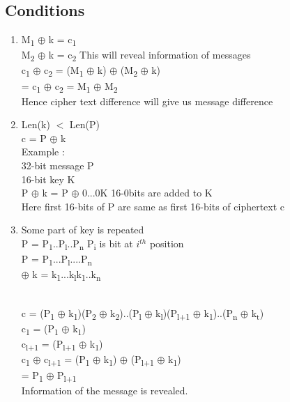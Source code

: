\documentclass[11pt]{article}
\begin{document}
	\subsection*{Conditions}
	\begin{enumerate}
		\item M\textsubscript1 $\oplus$ k = c\textsubscript1 \\
		M\textsubscript2 $\oplus$ k = c\textsubscript2 \hspace{1cm} This will reveal information of messages\\
		c\textsubscript1 $\oplus$ c\textsubscript2 = (M\textsubscript1 $\oplus$ k) $\oplus$ (M\textsubscript2 $\oplus$ k)\\\hspace{1.4cm}= c\textsubscript1 $\oplus$ c\textsubscript2 = M\textsubscript1 $\oplus$ M\textsubscript2\\
		Hence cipher text difference will give us message difference
		\item Len(k) $<$ Len(P)\\
		c = P $\oplus$ k\\
		Example :\\
		32-bit message P\\
		16-bit key K\\
		P $\oplus$ k = P $\oplus$ 0...0K \hspace{1cm} 16-0bits are added to K\\
		Here first 16-bits of P are same as first 16-bits of ciphertext c \\
		\item Some part of key is repeated \\
		P = P\textsubscript{1}..P\textsubscript{l}..P\textsubscript{n} \hfill P\textsubscript{i} is bit at $i^{th}$ position\\ \vspace{.3cm}
		\hspace{0.33cm}P = P\textsubscript{1}...P\textsubscript{l}....P\textsubscript{n}\\
		$\oplus$ k = k\textsubscript{1}...k\textsubscript{l}k\textsubscript{1}..k\textsubscript{n}\\
		\\
		c = (P\textsubscript{1} $\oplus$ k\textsubscript{1})(P\textsubscript{2} $\oplus$ k\textsubscript{2})..(P\textsubscript{l} $\oplus$ k\textsubscript{l})(P\textsubscript{l+1} $\oplus$ k\textsubscript{1})..(P\textsubscript{n} $\oplus$ k\textsubscript{t})\\
		c\textsubscript{1} = (P\textsubscript{1} $\oplus$ k\textsubscript{1})\\
		c\textsubscript{l+1} = (P\textsubscript{l+1} $\oplus$ k\textsubscript{1})\\
		c\textsubscript{1} $\oplus$ c\textsubscript{l+1} = (P\textsubscript{1} $\oplus$ k\textsubscript{1}) $\oplus$ (P\textsubscript{l+1} $\oplus$ k\textsubscript{1})\\
		= P\textsubscript{1} $\oplus$ P\textsubscript{l+1}\\
		Information of the message is revealed.\\
	\end{enumerate}
\end{document}
